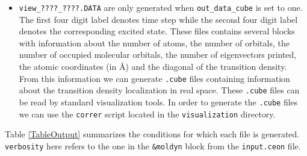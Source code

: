 \begin{itemize}
\item \verb+view_????_????.DATA+ are only generated when \verb+out_data_cube+ is set to one. The first four digit label denotes time step while the second four digit label denotes the corresponding excited state. These files contains several blocks with information about the number of atoms, the number of orbitals, the number of occupied molecular orbitals, the number of eigenvectors printed, the atomic coordinates (in \AA) and the diagonal of the transition density. From this information we can generate \verb+.cube+ files containing information about the transition density localization in real space. These \verb+.cube+ files can be read by standard visualization tools. In order to generate the \verb+.cube+ files we can use the \verb+correr+ script located in the \verb+visualization+ directory.
\end{itemize}

Table \ref{TableOutput} summarizes the conditions for which each file is generated. \verb+verbosity+ here refers to the one in the \verb+&moldyn+ block from the \verb+input.ceon+ file.

